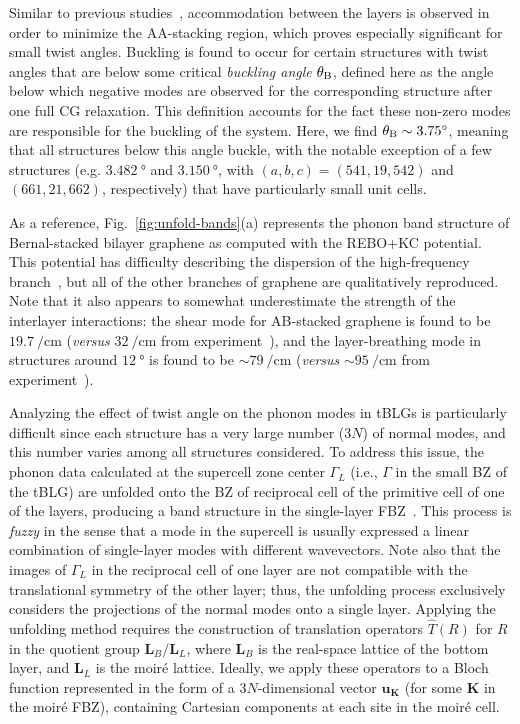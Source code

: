 \documentclass[prl,preprint]{revtex4}
\newcommand{\wavenumber}{\per\cm}
\renewcommand{\vec}[1]{\mathbf{#1}}
\newcommand{\paren}[1]{\left(#1\right)}
\newcommand{\KG}{\Gamma}
\newcommand{\translationOper}[1]{\hat{T}\!\paren{#1}}
\begin{document}
Similar to previous studies~\cite{Alden2013,Nam2017,Wijk2015,Dai2016,Jain2016,Choi2018,Koshino2019b,Yong2019}, accommodation between the layers is observed in order to minimize the AA-stacking region, which proves especially significant for small twist angles. Buckling is found to occur for certain structures with twist angles that are below some critical \textit{buckling angle} $\theta_{\rm B}$, defined here as the angle below which negative modes are observed for the corresponding structure after one full CG relaxation. This definition accounts for the fact these non-zero modes are responsible for the buckling of the system.  Here, we find $\theta_{\rm B}\sim\SI{3.75}{\degree}$, meaning that all structures below this angle buckle, with the notable exception of a few structures (e.g. $\SI{3.482}{\degree}$ and $\SI{3.150}{\degree}$, with $(a,b,c)=(541, 19, 542)$ and $(661, 21, 662)$, respectively) that have particularly small unit cells.

As a reference, Fig.~\ref{fig:unfold-bands}(a) represents the phonon band structure of Bernal-stacked bilayer graphene as computed with the REBO+\gls{KC} potential.  This potential has difficulty describing the dispersion of the high-frequency branch~\cite{Maultzsch2004}, but all of the other branches of graphene are qualitatively reproduced. Note that it also appears to somewhat underestimate the strength of the interlayer interactions: the shear mode for AB-stacked graphene is found to be $\SI{19.7}{\wavenumber}$ (\textit{versus} $\SI{32}{\wavenumber}$ from experiment~\cite{tan2012ShearModeMultilayer}), and the layer-breathing mode in structures around $\SI{12}{\degree}$ is found to be $\sim\SI{79}{\wavenumber}$ (\textit{versus} $\sim\SI{95}{\wavenumber}$ from experiment~\cite{he2013ObservationLowEnergy}).

Analyzing the effect of twist angle on the phonon modes in tBLGs is particularly difficult since each structure has a very large number ($3N$) of normal modes, and this number varies among all structures considered. To address this issue, the phonon data calculated at the supercell zone center $\KG_L$ (i.e., $\Gamma$ in the small BZ of the tBLG) are unfolded onto the BZ of reciprocal cell of the primitive cell of one of the layers, producing a band structure in the single-layer \gls{FBZ}~\cite{allen2013RecoveringHiddenBloch}. This process is \textit{fuzzy} in the sense that a mode in the supercell is usually expressed a linear combination of single-layer modes with different wavevectors. Note also that the images of $\Gamma_L$ in the reciprocal cell of one layer are not compatible with the translational symmetry of the other layer; thus, the unfolding process exclusively considers the projections of the normal modes onto a single layer.  Applying the unfolding method requires the construction of translation operators $\translationOper{R}$ for $R$ in the quotient group $\mathbf{L}_B/\mathbf{L}_L$, where $\mathbf{L}_B$ is the real-space lattice of the bottom layer, and $\mathbf{L}_L$ is the moir\'e lattice. Ideally, we apply these operators to a Bloch function represented in the form of a $3N$-dimensional vector $\vec u_{\vec K}$ (for some $\vec K$ in the moir\'e \gls{FBZ}), containing Cartesian components at each site in the moir\'e cell.
\end{document}
